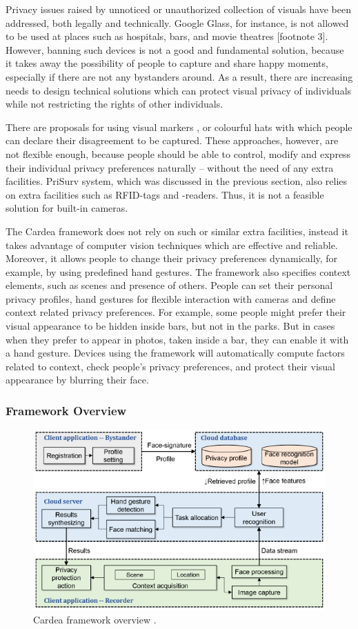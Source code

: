 \documentclass[conference]{IEEEtran}
\begin{document}
Privacy issues raised by unnoticed or unauthorized collection of visuals have been addressed, both legally and technically. Google Glass, for instance, is not allowed to be used at places such as hospitals, bars, and movie theatres [footnote 3]. However, banning such devices is not a good and fundamental solution, because it takes away the possibility of people to capture and share happy moments, especially if there are not any bystanders around. As a result, there are increasing needs to design technical solutions which can protect visual privacy of individuals while not restricting the rights of other individuals. 
	
There are proposals for using visual markers \cite{roesner2014},\cite{liu2014} or colourful hats \cite{sastry2007} with which people can declare their disagreement to be captured. These approaches, however, are not flexible enough, because people should be able to control, modify and express their individual privacy preferences naturally – without the need of any extra facilities. PriSurv system, which was discussed in the previous section, also relies on extra facilities such as \ac{RFID}-tags and -readers. Thus, it is not a feasible solution for built-in cameras. 

The Cardea framework \cite{shu2016cardea} does not rely on such or similar extra facilities, instead it takes advantage of computer vision techniques which are effective and reliable. Moreover, it allows people to change their privacy preferences dynamically, for example, by using predefined hand gestures. The framework also specifies context elements, such as scenes and presence of others. People can set their personal privacy profiles, hand gestures for flexible interaction with cameras and define context related privacy preferences. For example, some people might prefer their visual appearance to be hidden inside bars, but not in the parks. But in cases when they prefer to appear in photos, taken inside a bar, they can enable it with a hand gesture. Devices using the framework will automatically compute factors related to context, check people's privacy preferences, and protect their visual appearance by blurring their face.


\subsubsection{Framework Overview}
\begin{figure}[t]
\centerline{\includegraphics[width=.5\textwidth]{img/cardea_overview_diagram.png}}
\caption{Cardea framework overview \cite{shu2016cardea}.}
\label{fig:cardea2}
\end{figure}
\end{document}
